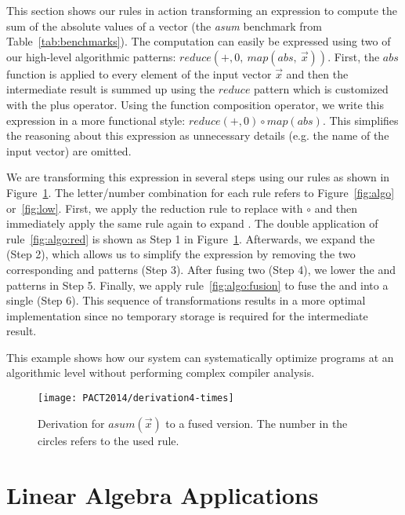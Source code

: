 This section shows our rules in action transforming an expression to compute the sum of the absolute values of a vector (the \emph{asum} benchmark from Table~\ref{tab:benchmarks}).
The computation can easily be expressed using two of our high-level algorithmic patterns:
$reduce(+, 0,\ map(abs,\ \vec{x}))$.
First, the $abs$ function is applied to every element of the input vector $\vec{x}$ and then the intermediate result is summed up using the $reduce$ pattern which is customized with the plus operator.
Using the function composition operator, we write this expression in a more functional style:
$reduce(+, 0) \circ map(abs)$.
This simplifies the reasoning about this expression as unnecessary details (e.g. the name of the input vector) are omitted.

We are transforming this expression in several steps using our rules as shown in Figure~\ref{fig:derivation}.
The letter/number combination for each rule refers to Figure~\ref{fig:algo} or~\ref{fig:low}.
First, we apply the reduction rule to replace  with  $\circ$  and then immediately apply the same rule again to expand .
The double application of rule~\ref{fig:algo:red} is shown as Step 1 in Figure~\ref{fig:derivation}.
Afterwards, we expand the  (Step 2), which allows us to simplify the expression by removing the two corresponding  and  patterns (Step 3).
After fusing two  (Step 4), we lower the  and  patterns in Step 5.
Finally, we apply rule~\ref{fig:algo:fusion} to fuse the  and  into a single  (Step 6).
This sequence of transformations results in a more optimal implementation since no temporary storage is required for the intermediate result.

This example shows how our system can systematically optimize programs at an algorithmic level without performing complex compiler analysis.

\begin{figure}[t]
\centering
\texttt{[image: PACT2014/derivation4-times]}
\caption{Derivation for $asum(\vec{x})$ to a fused version.
  The number in the circles refers to the used rule.
}
\label{fig:derivation}
\end{figure}


\section{Linear Algebra Applications}

